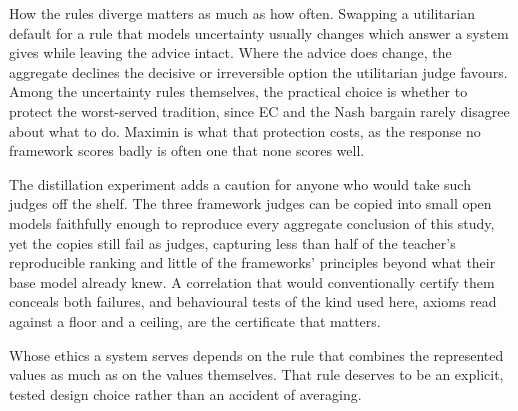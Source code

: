 \documentclass[10pt,twocolumn,a4paper]{article}
\begin{document}
How the rules diverge matters as much as how often. Swapping a
utilitarian default for a rule that models uncertainty usually changes
which answer a system gives while leaving the advice intact. Where the
advice does change, the aggregate declines the decisive or irreversible
option the utilitarian judge favours. Among the uncertainty rules
themselves, the practical choice is whether to protect the worst-served
tradition, since EC and the Nash bargain rarely disagree about
what to do. Maximin is what that protection costs, as the response
no framework scores badly is often one that none scores well.

The distillation experiment adds a caution for anyone who would take
such judges off the shelf. The three framework judges can be copied
into small open models faithfully enough to reproduce every aggregate
conclusion of this study, yet the copies still fail as judges,
capturing less than half of the teacher's reproducible ranking and
little of the frameworks' principles beyond what their base model
already knew. A correlation that would conventionally certify them
conceals both failures, and behavioural tests of the kind used here,
axioms read against a floor and a ceiling, are the certificate that
matters.

Whose ethics a system serves depends on the rule that combines the
represented values as much as on the values themselves. That rule
deserves to be an explicit, tested design choice rather than an
accident of averaging.
\end{document}
